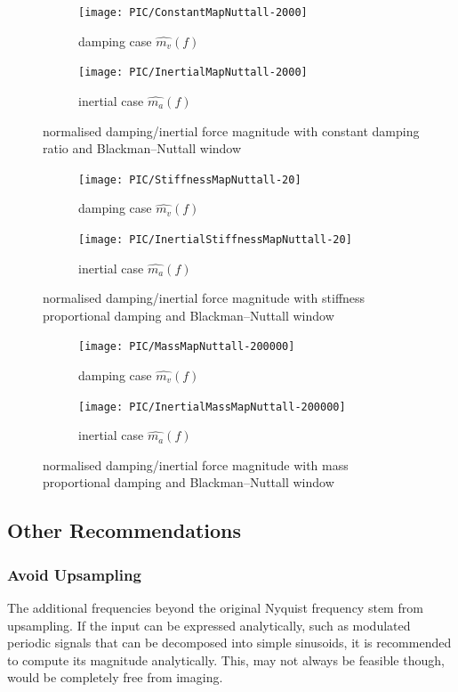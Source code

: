 \begin{figure}[htb!]
\centering
\begin{subfigure}{.48\textwidth}
\texttt{[image: PIC/ConstantMapNuttall-2000]}
\caption{damping case $\hat{m_v}\left(f\right)$}
\end{subfigure}
\begin{subfigure}{.48\textwidth}
\texttt{[image: PIC/InertialMapNuttall-2000]}
\caption{inertial case $\hat{m_a}\left(f\right)$}
\end{subfigure}
\caption{normalised damping/inertial force magnitude with constant damping ratio and Blackman--Nuttall window}\label{fig:map_constant_nuttall}
\end{figure}
\begin{figure}[htb!]
\centering
\begin{subfigure}{.48\textwidth}
\texttt{[image: PIC/StiffnessMapNuttall-20]}
\caption{damping case $\hat{m_v}\left(f\right)$}
\end{subfigure}
\begin{subfigure}{.48\textwidth}
\texttt{[image: PIC/InertialStiffnessMapNuttall-20]}
\caption{inertial case $\hat{m_a}\left(f\right)$}
\end{subfigure}
\caption{normalised damping/inertial force magnitude with stiffness proportional damping and Blackman--Nuttall window}\label{fig:map_stiffness_nuttall}
\end{figure}
\begin{figure}[htb!]
\centering
\begin{subfigure}{.48\textwidth}
\texttt{[image: PIC/MassMapNuttall-200000]}
\caption{damping case $\hat{m_v}\left(f\right)$}
\end{subfigure}
\begin{subfigure}{.48\textwidth}
\texttt{[image: PIC/InertialMassMapNuttall-200000]}
\caption{inertial case $\hat{m_a}\left(f\right)$}
\end{subfigure}
\caption{normalised damping/inertial force magnitude with mass proportional damping and Blackman--Nuttall window}\label{fig:map_mass_nuttall}
\end{figure}
\subsection{Other Recommendations}
\subsubsection{Avoid Upsampling}
The additional frequencies beyond the original Nyquist frequency stem from upsampling. If the input can be expressed analytically, such as modulated periodic signals that can be decomposed into simple sinusoids, it is recommended to compute its magnitude analytically. This, may not always be feasible though, would be completely free from imaging.

